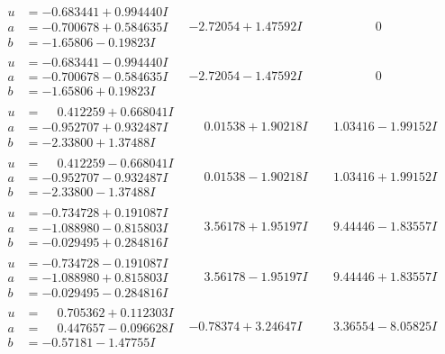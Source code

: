 \documentclass[1p]{elsarticle_modified}
\theoremstyle{definition}
\begin{document}
$$\begin{array}{c|c|c}
\begin{aligned}
u &= -0.683441 + 0.994440 I \\
a &= -0.700678 + 0.584635 I \\
b &= -1.65806 - 0.19823 I\end{aligned}
 & -2.72054 + 1.47592 I & \phantom{-0.000000 } 0 \\ \hline\begin{aligned}
u &= -0.683441 - 0.994440 I \\
a &= -0.700678 - 0.584635 I \\
b &= -1.65806 + 0.19823 I\end{aligned}
 & -2.72054 - 1.47592 I & \phantom{-0.000000 } 0 \\ \hline\begin{aligned}
u &= \phantom{-}0.412259 + 0.668041 I \\
a &= -0.952707 + 0.932487 I \\
b &= -2.33800 + 1.37488 I\end{aligned}
 & \phantom{-}0.01538 + 1.90218 I & \phantom{-}1.03416 - 1.99152 I \\ \hline\begin{aligned}
u &= \phantom{-}0.412259 - 0.668041 I \\
a &= -0.952707 - 0.932487 I \\
b &= -2.33800 - 1.37488 I\end{aligned}
 & \phantom{-}0.01538 - 1.90218 I & \phantom{-}1.03416 + 1.99152 I \\ \hline\begin{aligned}
u &= -0.734728 + 0.191087 I \\
a &= -1.088980 - 0.815803 I \\
b &= -0.029495 + 0.284816 I\end{aligned}
 & \phantom{-}3.56178 + 1.95197 I & \phantom{-}9.44446 - 1.83557 I \\ \hline\begin{aligned}
u &= -0.734728 - 0.191087 I \\
a &= -1.088980 + 0.815803 I \\
b &= -0.029495 - 0.284816 I\end{aligned}
 & \phantom{-}3.56178 - 1.95197 I & \phantom{-}9.44446 + 1.83557 I \\ \hline\begin{aligned}
u &= \phantom{-}0.705362 + 0.112303 I \\
a &= \phantom{-}0.447657 - 0.096628 I \\
b &= -0.57181 - 1.47755 I\end{aligned}
 & -0.78374 + 3.24647 I & \phantom{-}3.36554 - 8.05825 I \\ \hline\begin{aligned}

\end{aligned}
\end{array}$$
\end{document}

